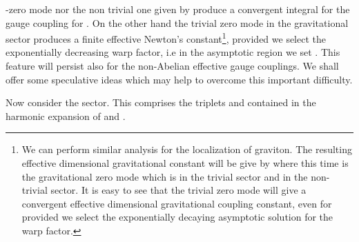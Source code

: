 \documentclass[a4paper,12pt]{article}
\begin{document}
\coordHE{}-zero mode nor the non trivial one given by \coordHE{} produce a convergent integral for the gauge coupling for
\coordHE{}. On the other hand the trivial zero mode in the gravitational
sector produces a finite \coordHE{} effective Newton's
constant\footnote{We can perform similar analysis for the
localization of graviton. The resulting effective \coordHE{} dimensional
gravitational constant will be give by \coordHE{}
where this time \myHighlight{$\Psi$}\coordHE{} is the gravitational \coordHE{} zero mode which is
\coordHE{} in the trivial sector and \coordHE{} in the non-trivial sector. It is easy to see
that the trivial \coordHE{} zero mode will give a convergent effective \coordHE{}
dimensional gravitational coupling constant, even for \coordHE{}
provided we select the exponentially decaying asymptotic solution for
the warp factor.}, provided we select the exponentially decreasing
warp factor, i.e in the asymptotic region we set \coordHE{}. This feature will persist also for the non-Abelian effective
gauge couplings. We shall offer some speculative ideas which may help
to overcome this important difficulty.

Now consider the \coordHE{} sector. This comprises the \coordHE{} triplets
\coordHE{} and \coordHE{} contained in the harmonic
expansion of \coordHE{} and \coordHE{}.
\end{document}
